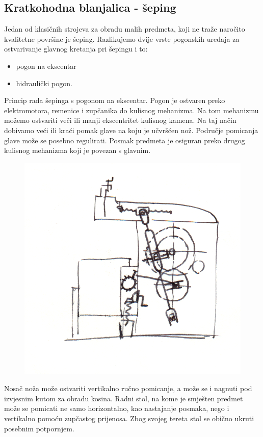 \documentclass[a4paper,12pt]{article}
\numberwithin{figure}{section}
\begin{document}
\subsection{Kratkohodna blanjalica - šeping}
Jedan od klasičnih strojeva za obradu malih predmeta, koji ne traže naročito kvalitetne površine je šeping. Razlikujemo dvije vrste pogonskih uređaja za ostvarivanje glavnog kretanja pri šepingu i to:
\begin{itemize}
\item pogon na ekscentar
\item hidraulički pogon.
\end{itemize}
Princip rada šepinga s pogonom na ekscentar. Pogon je  ostvaren preko elektromotora, remenice i zupčanika do kulisnog mehanizma. Na tom mehanizmu možemo ostvariti veči ili manji ekscentritet kulisnog kamena. Na taj način dobivamo veći ili kraći pomak glave na koju je učvršćen nož. Područje pomicanja glave može se posebno regulirati. Posmak predmeta je osiguran preko drugog kulisnog mehanizma koji je povezan s glavnim.
\begin{figure}[!h]
\centering
\includegraphics[scale=0.15]{image_15-1.png}
\end{figure}
\FloatBarrier
Nosač noža može ostvariti vertikalno ručno pomicanje, a može se i nagnuti pod izvjesnim kutom za obradu kosina. Radni stol, na kome je smješten predmet može se pomicati ne samo horizontalno, kao nastajanje posmaka, nego i vertikalno pomoću zupčastog prijenosa. Zbog svojeg tereta stol se obično ukruti posebnim potpornjem. 
\end{document}

